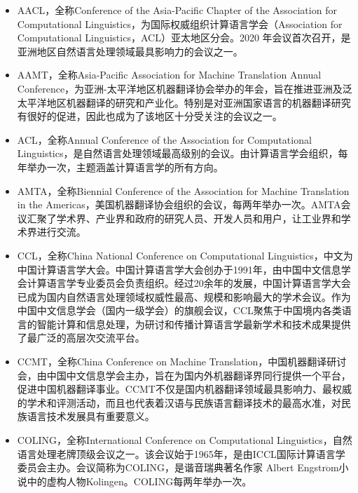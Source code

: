 \begin{itemize}
\vspace{0.5em}
\item AACL，全称Conference of the Asia-Pacific Chapter of the Association for Computational Linguistics，为国际权威组织计算语言学会（Association for Computational Linguistics，ACL）亚太地区分会。2020 年会议首次召开，是亚洲地区自然语言处理领域最具影响力的会议之一。
\vspace{0.5em}
\item AAMT，全称Asia-Pacific Association for Machine Translation Annual Conference，为亚洲-太平洋地区机器翻译协会举办的年会，旨在推进亚洲及泛太平洋地区机器翻译的研究和产业化。特别是对亚洲国家语言的机器翻译研究有很好的促进，因此也成为了该地区十分受关注的会议之一。
\vspace{0.5em}
\item ACL，全称Annual Conference of the Association for Computational Linguistics，是自然语言处理领域最高级别的会议。由计算语言学会组织，每年举办一次，主题涵盖计算语言学的所有方向。
\vspace{0.5em}
\item AMTA，全称Biennial Conference of the Association for Machine Translation in the Americas，美国机器翻译协会组织的会议，每两年举办一次。AMTA会议汇聚了学术界、产业界和政府的研究人员、开发人员和用户，让工业界和学术界进行交流。
\vspace{0.5em}
\item CCL，全称China National Conference on Computational Linguistics，中文为中国计算语言学大会。中国计算语言学大会创办于1991年，由中国中文信息学会计算语言学专业委员会负责组织。经过20余年的发展，中国计算语言学大会已成为国内自然语言处理领域权威性最高、规模和影响最大的学术会议。作为中国中文信息学会（国内一级学会）的旗舰会议，CCL聚焦于中国境内各类语言的智能计算和信息处理，为研讨和传播计算语言学最新学术和技术成果提供了最广泛的高层次交流平台。
\vspace{0.5em}
\item CCMT，全称China Conference on Machine Translation，中国机器翻译研讨会，由中国中文信息学会主办，旨在为国内外机器翻译界同行提供一个平台，促进中国机器翻译事业。CCMT不仅是国内机器翻译领域最具影响力、最权威的学术和评测活动，而且也代表着汉语与民族语言翻译技术的最高水准，对民族语言技术发展具有重要意义。
\vspace{0.5em}
\item COLING，全称International Conference on Computational Linguistics，自然语言处理老牌顶级会议之一。该会议始于1965年，是由ICCL国际计算语言学委员会主办。会议简称为COLING，是谐音瑞典著名作家 Albert Engstr$\ddot{\textrm{o}}$m小说中的虚构人物Kolingen。COLING每两年举办一次。

\end{itemize}
